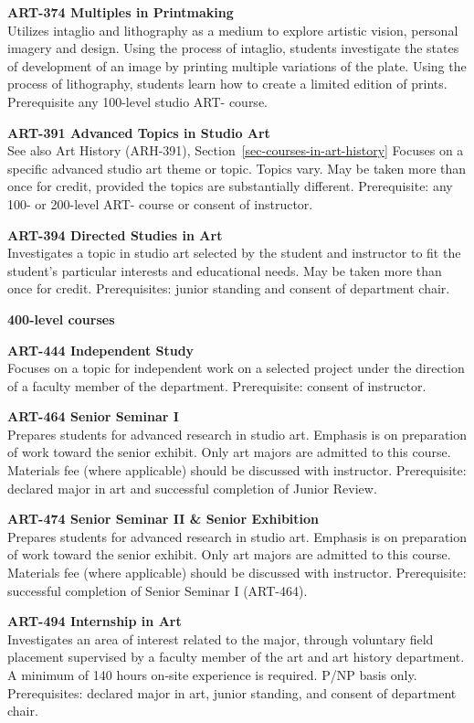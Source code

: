 \documentclass[
  letterpaper,
]{scrbook}
\begin{document}
\textbf{ART-374 Multiples in Printmaking}\\
Utilizes intaglio and lithography as a medium to explore artistic
vision, personal imagery and design. Using the process of intaglio,
students investigate the states of development of an image by printing
multiple variations of the plate. Using the process of lithography,
students learn how to create a limited edition of prints. Prerequisite
any 100-level studio ART- course.

\textbf{ART-391 Advanced Topics in Studio Art}\\
See also Art History (ARH-391), Section~\ref{sec-courses-in-art-history}
Focuses on a specific advanced studio art theme or topic. Topics vary.
May be taken more than once for credit, provided the topics are
substantially different. Prerequisite: any 100- or 200-level ART- course
or consent of instructor.

\textbf{ART-394 Directed Studies in Art}\\
Investigates a topic in studio art selected by the student and
instructor to fit the student's particular interests and educational
needs. May be taken more than once for credit. Prerequisites: junior
standing and consent of department chair.

\textbf{400-level courses}

\textbf{ART-444 Independent Study}\\
Focuses on a topic for independent work on a selected project under the
direction of a faculty member of the department. Prerequisite: consent
of instructor.

\textbf{ART-464 Senior Seminar I}\\
Prepares students for advanced research in studio art. Emphasis is on
preparation of work toward the senior exhibit. Only art majors are
admitted to this course. Materials fee (where applicable) should be
discussed with instructor. Prerequisite: declared major in art and
successful completion of Junior Review.

\textbf{ART-474 Senior Seminar II \& Senior Exhibition}\\
Prepares students for advanced research in studio art. Emphasis is on
preparation of work toward the senior exhibit. Only art majors are
admitted to this course. Materials fee (where applicable) should be
discussed with instructor. Prerequisite: successful completion of Senior
Seminar I (ART-464).

\textbf{ART-494 Internship in Art}\\
Investigates an area of interest related to the major, through voluntary
field placement supervised by a faculty member of the art and art
history department. A minimum of 140 hours on-site experience is
required. P/NP basis only. Prerequisites: declared major in art, junior
standing, and consent of department chair.
\end{document}
